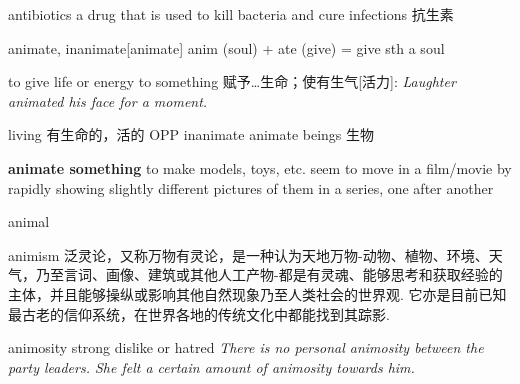 \begin{DefWord}{antibiotics}
    a drug that is used to kill bacteria and cure infections 抗生素
\end{DefWord}

\begin{DefWord}{animate, inanimate}[animate]
    anim (soul) + ate (give) = give sth a soul

    to give life or energy to something 赋予…生命；使有生气[活力]:
    \textit{Laughter animated his face for a moment.}

    living 有生命的，活的 OPP  inanimate
    animate beings 生物 

    \textbf{animate something} to make models, toys, etc. seem to move in a film/movie by rapidly showing slightly different pictures of them in a series, one after another
\end{DefWord}

\begin{DefWord}{animal}
\end{DefWord}

\begin{DefWord}{animism}
    泛灵论，又称万物有灵论，是一种认为天地万物-动物、植物、环境、天气，乃至言词、画像、建筑或其他人工产物-都是有灵魂、能够思考和获取经验的主体，并且能够操纵或影响其他自然现象乃至人类社会的世界观. 它亦是目前已知最古老的信仰系统，在世界各地的传统文化中都能找到其踪影. 
\end{DefWord}

\begin{DefWord}{animosity}
    strong dislike or hatred
    \textit{There is no personal animosity between the party leaders. She felt a certain amount of animosity towards him.}
\end{DefWord}
